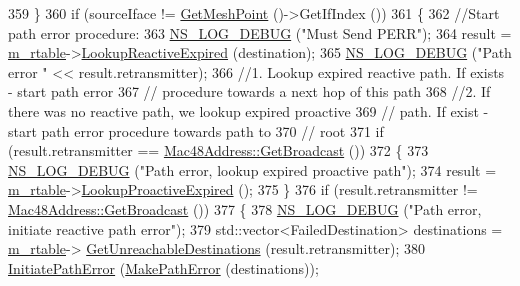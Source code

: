 \begin{DoxyCode}
359     \}
360   \textcolor{keywordflow}{if} (sourceIface != \hyperlink{classns3_1_1MeshL2RoutingProtocol_a630575428f626e58f0c8ac3fae24007e}{GetMeshPoint} ()->GetIfIndex ())
361     \{
362       \textcolor{comment}{//Start path error procedure:}
363       \hyperlink{group__logging_ga413f1886406d49f59a6a0a89b77b4d0a}{NS\_LOG\_DEBUG} (\textcolor{stringliteral}{"Must Send PERR"});
364       result = \hyperlink{classns3_1_1dot11s_1_1HwmpProtocol_a12fda0e3e5a400888c8ba1a87c1a7216}{m\_rtable}->\hyperlink{classns3_1_1dot11s_1_1HwmpRtable_a4c316ed97fff97b53cdb67c86eb3a0af}{LookupReactiveExpired} (destination);
365       \hyperlink{group__logging_ga413f1886406d49f59a6a0a89b77b4d0a}{NS\_LOG\_DEBUG} (\textcolor{stringliteral}{"Path error "} << result.retransmitter);
366       \textcolor{comment}{//1.  Lookup expired reactive path. If exists - start path error}
367       \textcolor{comment}{//    procedure towards a next hop of this path}
368       \textcolor{comment}{//2.  If there was no reactive path, we lookup expired proactive}
369       \textcolor{comment}{//    path. If exist - start path error procedure towards path to}
370       \textcolor{comment}{//    root}
371       \textcolor{keywordflow}{if} (result.retransmitter == \hyperlink{classns3_1_1Mac48Address_a55156e302c6bf950c0b558365adbde84}{Mac48Address::GetBroadcast} ())
372         \{
373           \hyperlink{group__logging_ga413f1886406d49f59a6a0a89b77b4d0a}{NS\_LOG\_DEBUG} (\textcolor{stringliteral}{"Path error, lookup expired proactive path"});
374           result = \hyperlink{classns3_1_1dot11s_1_1HwmpProtocol_a12fda0e3e5a400888c8ba1a87c1a7216}{m\_rtable}->\hyperlink{classns3_1_1dot11s_1_1HwmpRtable_a8e40d22f24cb03d9d06f36484f29b805}{LookupProactiveExpired} ();
375         \}
376       \textcolor{keywordflow}{if} (result.retransmitter != \hyperlink{classns3_1_1Mac48Address_a55156e302c6bf950c0b558365adbde84}{Mac48Address::GetBroadcast} ())
377         \{
378           \hyperlink{group__logging_ga413f1886406d49f59a6a0a89b77b4d0a}{NS\_LOG\_DEBUG} (\textcolor{stringliteral}{"Path error, initiate reactive path error"});
379           std::vector<FailedDestination> destinations = \hyperlink{classns3_1_1dot11s_1_1HwmpProtocol_a12fda0e3e5a400888c8ba1a87c1a7216}{m\_rtable}->
      \hyperlink{classns3_1_1dot11s_1_1HwmpRtable_aa7b1e562530f1a859ee59aa019570287}{GetUnreachableDestinations} (result.retransmitter);
380           \hyperlink{classns3_1_1dot11s_1_1HwmpProtocol_aa096a2aa2d9bae96602e9f4c8547cb4f}{InitiatePathError} (\hyperlink{classns3_1_1dot11s_1_1HwmpProtocol_a214ed61f71ad4537ccb10189d04b981f}{MakePathError} (destinations));

\end{DoxyCode}
